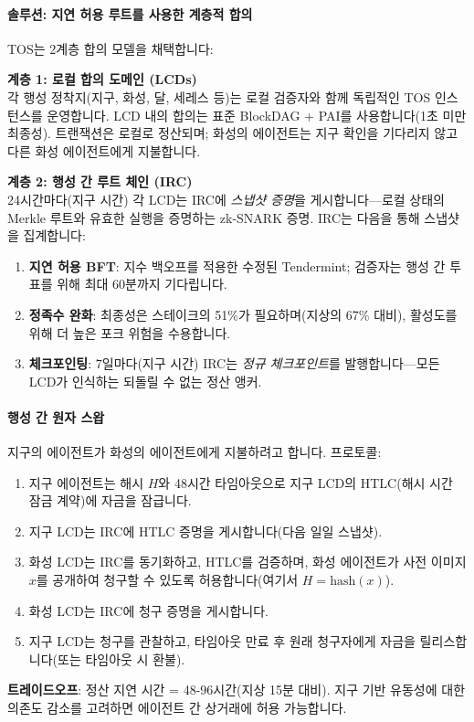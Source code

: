 \documentclass[11pt]{article}
\begin{document}
\paragraph{솔루션: 지연 허용 루트를 사용한 계층적 합의}
TOS는 2계층 합의 모델을 채택합니다:

\textbf{계층 1: 로컬 합의 도메인 (LCDs)}\\
각 행성 정착지(지구, 화성, 달, 세레스 등)는 로컬 검증자와 함께 독립적인 TOS 인스턴스를 운영합니다. LCD 내의 합의는 표준 BlockDAG + PAI를 사용합니다(1초 미만 최종성). 트랜잭션은 로컬로 정산되며; 화성의 에이전트는 지구 확인을 기다리지 않고 다른 화성 에이전트에게 지불합니다.

\textbf{계층 2: 행성 간 루트 체인 (IRC)}\\
24시간마다(지구 시간) 각 LCD는 IRC에 \emph{스냅샷 증명}을 게시합니다—로컬 상태의 Merkle 루트와 유효한 실행을 증명하는 zk-SNARK 증명. IRC는 다음을 통해 스냅샷을 집계합니다:
\begin{enumerate}[noitemsep]
  \item \textbf{지연 허용 BFT}: 지수 백오프를 적용한 수정된 Tendermint; 검증자는 행성 간 투표를 위해 최대 60분까지 기다립니다.
  \item \textbf{정족수 완화}: 최종성은 스테이크의 51\%가 필요하며(지상의 67\% 대비), 활성도를 위해 더 높은 포크 위험을 수용합니다.
  \item \textbf{체크포인팅}: 7일마다(지구 시간) IRC는 \emph{정규 체크포인트}를 발행합니다—모든 LCD가 인식하는 되돌릴 수 없는 정산 앵커.
\end{enumerate}

\paragraph{행성 간 원자 스왑}
지구의 에이전트가 화성의 에이전트에게 지불하려고 합니다. 프로토콜:
\begin{enumerate}[noitemsep]
  \item 지구 에이전트는 해시 $H$와 48시간 타임아웃으로 지구 LCD의 HTLC(해시 시간 잠금 계약)에 자금을 잠급니다.
  \item 지구 LCD는 IRC에 HTLC 증명을 게시합니다(다음 일일 스냅샷).
  \item 화성 LCD는 IRC를 동기화하고, HTLC를 검증하며, 화성 에이전트가 사전 이미지 $x$를 공개하여 청구할 수 있도록 허용합니다(여기서 $H = \text{hash}(x)$).
  \item 화성 LCD는 IRC에 청구 증명을 게시합니다.
  \item 지구 LCD는 청구를 관찰하고, 타임아웃 만료 후 원래 청구자에게 자금을 릴리스합니다(또는 타임아웃 시 환불).
\end{enumerate}
\textbf{트레이드오프}: 정산 지연 시간 = 48-96시간(지상 15분 대비). 지구 기반 유동성에 대한 의존도 감소를 고려하면 에이전트 간 상거래에 허용 가능합니다.
\end{document}
